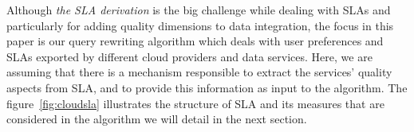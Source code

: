 Although \textit{the SLA derivation} is the big challenge while dealing with
SLAs and particularly for adding quality dimensions to data integration, the
focus in this paper is our query rewriting algorithm which deals with user
preferences and SLAs exported by different cloud providers and data services.
Here, we are assuming that there is a mechanism responsible to extract the
services' quality aspects from SLA, and to provide this information as input to
the algorithm. The figure~\ref{fig:cloudsla} illustrates the structure of SLA
and its measures that are considered in the algorithm we will detail in the next
section.   
%
